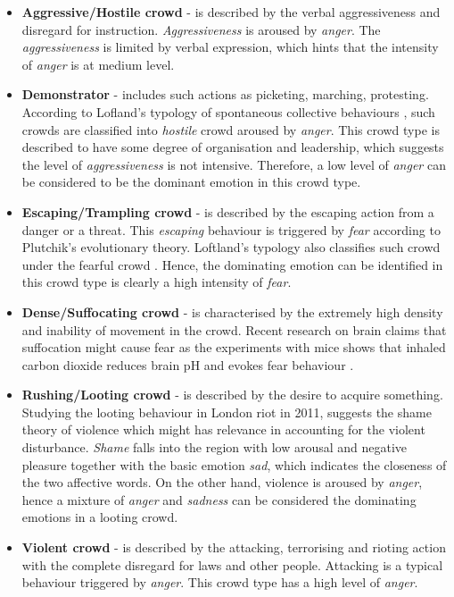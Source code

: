 \begin{itemize}
\item \textbf{Aggressive/Hostile crowd} - is described by the verbal aggressiveness and disregard for instruction. \textit{Aggressiveness} is aroused by \textit{anger}. The \textit{aggressiveness} is limited by verbal expression, which hints that the intensity of \textit{anger} is at medium level.
\item \textbf{Demonstrator} - includes such actions as picketing, marching, protesting. According to Lofland's typology of spontaneous collective behaviours \citep{Kornblum2011}, such crowds are classified into \textit{hostile} crowd aroused by \textit{anger}. This crowd type is described to have some degree of organisation and leadership, which suggests the level of \textit{aggressiveness} is not intensive. Therefore, a low level of \textit{anger} can be considered to be the dominant emotion in this crowd type.
\item \textbf{Escaping/Trampling crowd} - is described by the escaping action from a danger or a threat. This \textit{escaping} behaviour is triggered by \textit{fear} according to Plutchik's evolutionary theory. Loftland's typology also classifies such crowd under the fearful crowd \cite{Kornblum2011}. Hence, the dominating emotion can be identified in this crowd type is clearly a high intensity of \textit{fear}.
\item \textbf{Dense/Suffocating crowd} - is characterised by the extremely high density and inability of movement in the crowd. Recent research on brain claims that suffocation might cause fear as the experiments with mice shows that inhaled carbon dioxide reduces brain pH and evokes fear behaviour \citep{ziemann2009amygdala}.
\item \textbf{Rushing/Looting crowd} - is described by the desire to acquire something. Studying the looting behaviour in London riot in 2011, \citet{ray2014shame} suggests the shame theory of violence which might has relevance in accounting for the violent disturbance. \textit{Shame} falls into the region with low arousal and negative pleasure together with the basic emotion \textit{sad}, which indicates the closeness of the two affective words. On the other hand, violence is aroused by \textit{anger}, hence a mixture of \textit{anger} and \textit{sadness} can be considered the dominating emotions in a looting crowd.
\item \textbf{Violent crowd} - is described by the attacking, terrorising and rioting action with the complete disregard for laws and other people. Attacking is a typical behaviour triggered by \textit{anger}. This crowd type has a high level of \textit{anger}.
\end{itemize}


